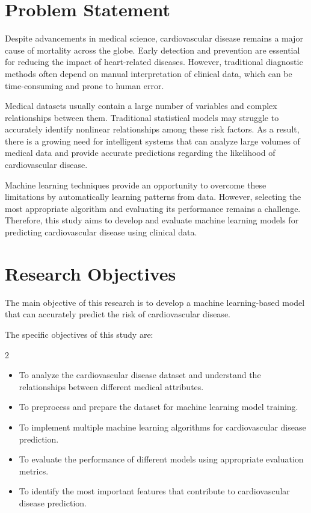 \section{Problem Statement}

Despite advancements in medical science, cardiovascular disease remains a major cause of mortality across the globe. Early detection and prevention are essential for reducing the impact of heart-related diseases. However, traditional diagnostic methods often depend on manual interpretation of clinical data, which can be time-consuming and prone to human error.

Medical datasets usually contain a large number of variables and complex relationships between them. Traditional statistical models may struggle to accurately identify nonlinear relationships among these risk factors. As a result, there is a growing need for intelligent systems that can analyze large volumes of medical data and provide accurate predictions regarding the likelihood of cardiovascular disease.

Machine learning techniques provide an opportunity to overcome these limitations by automatically learning patterns from data. However, selecting the most appropriate algorithm and evaluating its performance remains a challenge. Therefore, this study aims to develop and evaluate machine learning models for predicting cardiovascular disease using clinical data.

\section{Research Objectives}

The main objective of this research is to develop a machine learning-based model that can accurately predict the risk of cardiovascular disease.

The specific objectives of this study are:

\begin{multicols}{2}
\begin{itemize}
\item To analyze the cardiovascular disease dataset and understand the relationships between different medical attributes.
\item To preprocess and prepare the dataset for machine learning model training.
\item To implement multiple machine learning algorithms for cardiovascular disease prediction.
\item To evaluate the performance of different models using appropriate evaluation metrics.
\item To identify the most important features that contribute to cardiovascular disease prediction.
\end{itemize}
\end{multicols}

